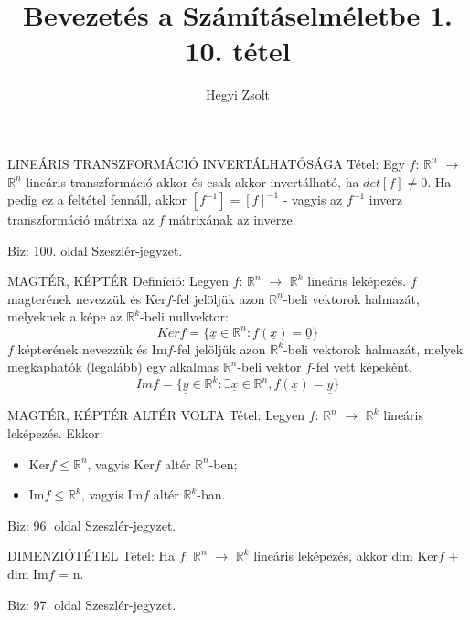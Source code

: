 \documentclass[]{article}
\title{Bevezetés a Számításelméletbe 1.\\{\large 10. tétel}}
\author{Hegyi Zsolt}
\newcommand{\R}{\mathbb{R}}
\newcommand{\Rn}[1]{$\mathbb{R}^{#1}$}
\newcommand{\Und}[1]{\underline{#1}}
\begin{document}
\maketitle{}
\begin{framed}
LINEÁRIS TRANSZFORMÁCIÓ INVERTÁLHATÓSÁGA Tétel: Egy $f$: \Rn{n} $\rightarrow$ \Rn{n} lineáris transzformáció akkor és csak akkor invertálható, ha $det[f] \neq 0$. Ha pedig ez a feltétel fennáll, akkor $[f^{-1}] = [f]^{-1}$ - vagyis az $f^{-1}$ inverz transzformáció mátrixa az $f$ mátrixának az inverze.
\end{framed}
\begin{leftbar}
Biz: 100. oldal Szeszlér-jegyzet.
\end{leftbar}
\begin{shaded}
MAGTÉR, KÉPTÉR Definíció: Legyen $f$: \Rn{n} $\rightarrow$ \Rn{k} lineáris leképezés. $f$ magterének nevezzük és Ker$f$-fel jelöljük azon \Rn{n}-beli vektorok halmazát, melyeknek a képe az \Rn{k}-beli nullvektor:
$$Kerf = \{\Und{x}\in \R^n : f(\Und{x}) = \Und{0}\}$$
$f$ képterének nevezzük és Im$f$-fel jelöljük azon \Rn{k}-beli vektorok halmazát, melyek megkaphatók (legalább) egy alkalmas \Rn{n}-beli vektor $f$-fel vett képeként.
$$Imf = \{\Und{y} \in \R^k : \exists\Und{x} \in \R^n, f(\Und{x}) = \Und{y}\}$$
\end{shaded}
\begin{framed}
MAGTÉR, KÉPTÉR ALTÉR VOLTA Tétel: Legyen $f$: \Rn{n} $\rightarrow$ \Rn{k} lineáris leképezés. Ekkor:
\begin{itemize}
\item Ker$f\leq\R^{n}$, vagyis Ker$f$ altér \Rn{n}-ben;
\item Im$f\leq\R^k$, vagyis Im$f$ altér \Rn{k}-ban.
\end{itemize}
\end{framed}
\begin{leftbar}
Biz: 96. oldal Szeszlér-jegyzet.
\end{leftbar}
\begin{framed}
DIMENZIÓTÉTEL Tétel: Ha $f$: \Rn{n} $\rightarrow$ \Rn{k} lineáris leképezés, akkor dim Ker$f$ + dim Im$f$ = n.
\end{framed}
\begin{leftbar}
Biz: 97. oldal Szeszlér-jegyzet.
\end{leftbar}
\end{document}

